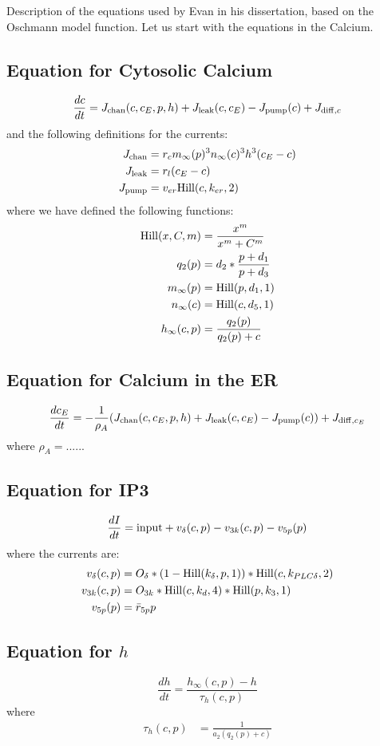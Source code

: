 \documentclass[11pt]{article}
\def\Hill{{\rm Hill}}
\def\diff{{\rm diff}}
\def\chan{{\rm chan}}
\def\pump{{\rm pump}}
\def\leak{{\rm leak}}
\begin{document}
Description of the equations used by Evan in his dissertation, based on the Oschmann model function. 
Let us start with the equations in the Calcium. 

\subsection{Equation for Cytosolic Calcium}
$$
\frac{dc}{dt} = J_{\chan}(c,c_E,p,h) + J_{\leak}(c,c_E) - J_{\pump}(c) + J_{\diff,c}
$$
and the following definitions for the currents: 
\begin{align}
  J_{\chan} &= r_c m_\infty(p)^3 n_\infty(c)^3 h^3 (c_E-c) \\
  J_{\leak} &= r_l (c_E - c) \\
  J_{\pump} &= v_{er} \Hill(c,k_{er}, 2)
\end{align}
where we have defined the following functions: 
\begin{align}
\Hill(x, C, m) &= \frac{x^m}{x^m+C^m} \\
q_2(p) &= d_2 * \frac{p +d_1}{p + d_3}\\
m_\infty(p) &= \Hill(p, d_1, 1)  \\
n_\infty(c) &= \Hill(c, d_5, 1)  \\
h_\infty(c, p) &= \frac{q_2(p)}{q_2(p) + c}
\end{align}

\subsection{Equation for Calcium in the ER}
$$
\frac{dc_E}{dt} = -\frac{1}{\rho_A} (J_{\chan}(c,c_E,p,h) + J_{\leak}(c,c_E) - J_{\pump}(c)) + J_{\diff,c_E}
$$
where $\rho_A= ......$

\subsection{Equation for IP3 }
$$
\frac{dI}{dt} = {\rm input} + v_\delta(c,p)  - v_{3k}(c,p) - v_{5p}(p)
$$
where the currents are: 
\begin{align}
v_\delta(c,p) &=  O_\delta * (1 - \Hill(k_\delta, p, 1) ) * \Hill(c,k_{PLC\delta},2)  \\
v_{3k}(c,p) &= O_{3k} * \Hill(c,k_d,4) * \Hill(p, k_3, 1) \\
v_{5p}(p) &= \bar{r}_{5p} p
\end{align}

\subsection{Equation for $h$}
$$
\frac{dh}{dt} = \frac{h_\infty(c,p)-h}{\tau_h(c,p)}
$$
where
\begin{align}
\tau_h(c,p) &= \frac{1}{a_2 (q_2(p) + c)}
\end{align}
\end{document}

